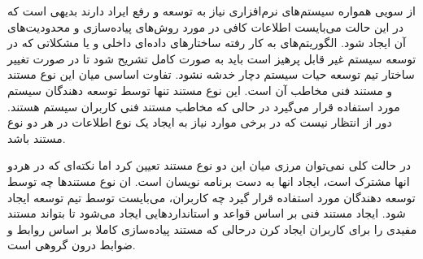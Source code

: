 از سویی همواره سیستم‌های نرم‌افزاری نیاز به توسعه و رفع ایراد دارند بدیهی است که
در این حالت می‌بایست اطلاعات کافی در مورد روش‌های پیاده‌سازی و محدودیت‌های آن
ایجاد شود. الگوریتم‌های به کار رفته ساختارهای داده‌ای داخلی و یا مشکلاتی که در
توسعه سیستم غیر قابل پرهیز است باید به صورت کامل تشریح شود تا در صورت تغییر
ساختار تیم توسعه حیات سیستم دچار خدشه نشود. تفاوت اساسی میان این نوع مستند و
مستند فنی مخاطب آن است. این نوع مستند تنها توسط توسعه دهندگان سیستم مورد استفاده
قرار می‌گیرد در حالی که مخاطب مستند فنی کاربران سیستم هستند. دور از انتظار نیست
که در برخی موارد نیاز به ایجاد یک نوع اطلاعات در هر دو نوع مستند باشد.

در حالت کلی نمی‌توان مرزی میان این دو نوع مستند تعیین کرد اما نکته‌ای که در هردو
انها مشترک است، ایجاد انها به دست برنامه نویسان است. ان نوع مستندها چه توسط
توسعه دهندگان مورد استفاده قرار گیرد چه کاربران، می‌بایست توسط تیم توسعه ایجاد
شود. ایجاد مستند فنی بر اساس قواعد و استانداردهایی ایجاد می‌شود تا بتواند مستند
مفیدی را برای کاربران ایجاد کرن درحالی که مستند پیاده‌سازی کاملا بر اساس روابط و
ضوابط درون گروهی است. 
